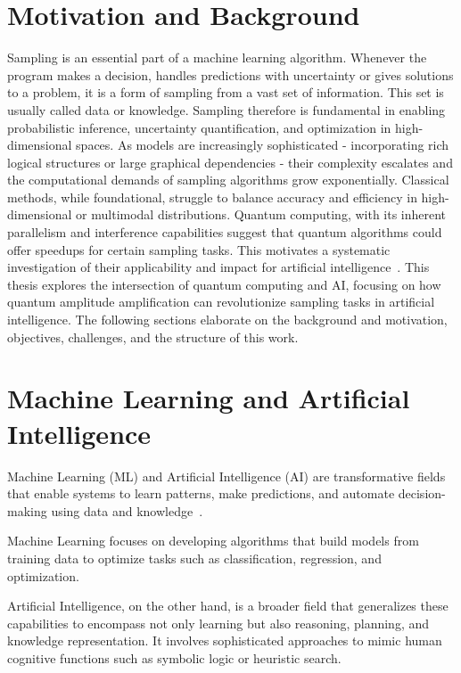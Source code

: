 \documentclass[encoding=utf8,british]{tumphthesis}
\begin{document}
    \section*{Motivation and Background}
    \label{sect:Intro_mot_back}
        Sampling is an essential part of a machine learning algorithm. Whenever the program makes a 
        decision, handles predictions with uncertainty or gives solutions to a problem, it is a form of sampling 
        from a vast set of information. This set is usually called data or knowledge.
        Sampling therefore is fundamental in enabling probabilistic inference, uncertainty quantification, 
        and optimization in high-dimensional spaces. As models are increasingly sophisticated - incorporating rich logical structures 
        or large graphical dependencies - their complexity escalates and the computational demands of sampling algorithms 
        grow exponentially. Classical methods, while foundational, struggle to balance accuracy and efficiency in 
        high-dimensional or multimodal distributions. Quantum computing, with its inherent parallelism and interference 
        capabilities suggest that quantum algorithms could offer speedups for certain sampling 
        tasks. This motivates a systematic investigation of their applicability and impact for artificial intelligence~\cite{Mansky_2023}\cite{PubMed}. 
        This thesis explores the intersection of quantum computing and AI, focusing on how quantum 
        amplitude amplification can revolutionize sampling tasks in artificial intelligence.
    The following sections elaborate on the background and motivation, objectives, challenges, and the structure 
    of this work.
    
    \section*{Machine Learning and Artificial Intelligence}
    \label{sect:Intro_ML_AI}
        Machine Learning (ML) and Artificial Intelligence (AI) are transformative fields that enable systems to learn patterns, 
        make predictions, and automate decision-making using data and knowledge~\cite{AI_modern}. 
        
        Machine Learning focuses on developing algorithms that build models from training data to optimize tasks such as classification, 
        regression, and optimization. 

        Artificial Intelligence, on the other hand, is a broader field that generalizes these capabilities to encompass not only learning but also reasoning, 
        planning, and knowledge representation. It involves sophisticated approaches to mimic human cognitive functions such as symbolic logic or heuristic search. 
\end{document}
